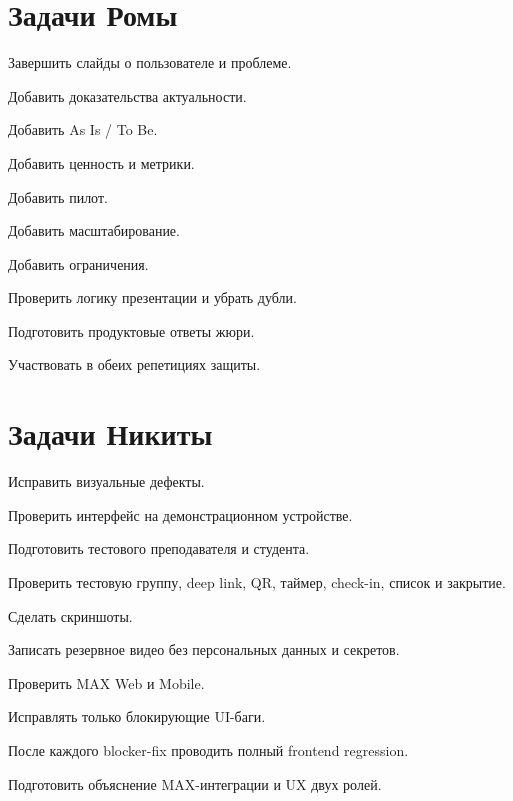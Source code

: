 \documentclass[11pt,a4paper]{article}
\begin{document}
\section{Задачи Ромы}
\begin{tasklist}
  \item Завершить слайды о пользователе и проблеме.
  \item Добавить доказательства актуальности.
  \item Добавить As Is / To Be.
  \item Добавить ценность и метрики.
  \item Добавить пилот.
  \item Добавить масштабирование.
  \item Добавить ограничения.
  \item Проверить логику презентации и убрать дубли.
  \item Подготовить продуктовые ответы жюри.
  \item Участвовать в обеих репетициях защиты.
\end{tasklist}

\section{Задачи Никиты}
\begin{tasklist}
  \item Исправить визуальные дефекты.
  \item Проверить интерфейс на демонстрационном устройстве.
  \item Подготовить тестового преподавателя и студента.
  \item Проверить тестовую группу, deep link, QR, таймер, check-in, список и закрытие.
  \item Сделать скриншоты.
  \item Записать резервное видео без персональных данных и секретов.
  \item Проверить MAX Web и Mobile.
  \item Исправлять только блокирующие UI-баги.
  \item После каждого blocker-fix проводить полный frontend regression.
  \item Подготовить объяснение MAX-интеграции и UX двух ролей.
\end{tasklist}
\end{document}
